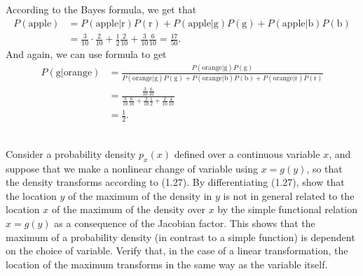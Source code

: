According to the Bayes formula, we get that 
\begin{align*}
P\left(\text{apple}\right) & =P\left(\text{apple}\vert\text{r}\right)P\left(\text{r}\right)+P\left(\text{apple}\vert\text{g}\right)P\left(\text{g}\right)+P\left(\text{apple}\vert\text{b}\right)P\left(\text{b}\right)\\
 & =\frac{3}{10}\cdot\frac{2}{10}+\frac{1}{2}\frac{2}{10}+\frac{3}{10}\frac{6}{10}=\frac{17}{50}.
\end{align*}
And again, we can use formula to get 
\begin{align*}
P\left(\text{g}\vert\text{orange}\right) & =\frac{P\left(\text{orange}\vert\text{g}\right)P\left(\text{g}\right)}{P\left(\text{orange}\vert\text{g}\right)P\left(\text{g}\right)+P\left(\text{orange}\vert\text{b}\right)P\left(\text{b}\right)+P\left(\text{orange}\vert\text{r}\right)P\left(\text{r}\right)}\\
 & =\frac{\frac{3}{10}\frac{6}{10}}{\frac{3}{10}\frac{6}{10}+\frac{2}{10}\frac{1}{2}+\frac{2}{10}\frac{4}{10}}\\
 & =\frac{1}{2}.
\end{align*}
\\
\begin{cBoxA}{}
 Consider a probability density $p_{x}(x)$ defined over a continuous
variable $x$, and suppose that we make a nonlinear change of variable
using $x=g(y)$, so that the density transforms according to (1.27).
By differentiating (1.27), show that the location $y$ of the maximum
of the density in $y$ is not in general related to the location $x$
of the maximum of the density over $x$ by the simple functional relation
$x=g(y)$ as a consequence of the Jacobian factor. This shows that
the maximum of a probability density (in contrast to a simple function)
is dependent on the choice of variable. Verify that, in the case of
a linear transformation, the location of the maximum transforms in
the same way as the variable itself.
\end{cBoxA}

